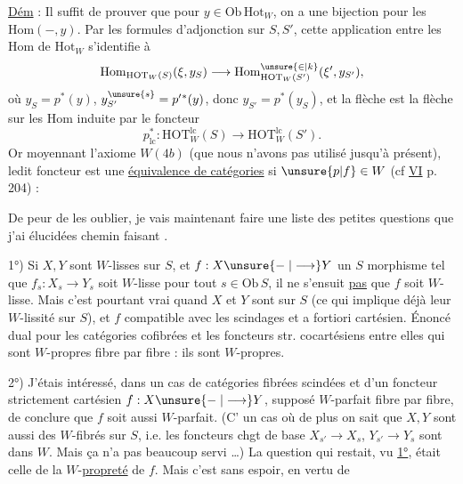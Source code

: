 \uline{Dém} : Il suffit de prouver que pour  $y\in\mathrm{Ob}\,\mathrm{Hot}_W$, on a une bijection pour les $\mathrm{Hom}(-,y)$. Par les formules d'adjonction sur $S,S'$, cette application entre les $\mathrm{Hom}$ de $\mathrm{Hot}_W$ s'identifie à
\[
\mathrm{Hom}_{\mathrm{HOT}_W(S)}(\xi,y_S)\longrightarrow\mathrm{Hom}_{\mathrm{HOT}_W(S')}^{\unsure{\in|k}}(\xi',y_{S'}),
\]
où $y_S=p^*(y)$, $y_{S'}^{\unsure{s}}=p'{}^*(y)$, donc $y_{S'}=p^*(y_S)$, et la flèche \unsure{(**)} est la flèche sur les $\mathrm{Hom}$ induite par le foncteur
\[
p_{\mathrm{lc}}^*:\mathrm{HOT}_W^{\mathrm{lc}}(S)\longrightarrow\mathrm{HOT}_W^{\mathrm{lc}}(S').
\]
Or moyennant l'axiome $W(4b)$\unsure{,} (que nous n'avons pas utilisé jusqu'à présent), ledit foncteur est une \uline{équivalence de catégories} si $\unsure{p|f}\in W$ (cf \uline{VI} p. 204) : 

De peur de les oublier, je vais maintenant faire une liste des petites questions que j'ai élucidées chemin faisant .

1°) Si $X,Y$ sont $W$-lisses sur $S$, et $f:X\unsure{\relbar|\longrightarrow}Y$ un $S$ morphisme tel que $f_s:X_s\longrightarrow Y_s$ soit $W$-lisse pour tout $s\in\mathrm{Ob}\,S$, il ne s'ensuit \uline{pas} que $f$ soit $W$-lisse. Mais c'est pourtant vrai quand $X$ et $Y$ sont   sur $S$ (ce
qui implique déjà leur $W$-lissité sur $S$), et $f$ compatible avec les scindages et a fortiori cartésien. Énoncé dual pour les catégories cofibrées  et les foncteurs str. cocartésiens entre elles qui sont $W$-propres fibre par fibre : ils sont $W$-propres.

2°) J'étais intéressé, dans un cas de catégories fibrées scindées  et d'un foncteur strictement cartésien $f:X\unsure{\relbar|\longrightarrow}Y$, supposé $W$-parfait fibre par fibre, de conclure que $f$ soit aussi $W$-parfait.  (C' un cas où de plus on sait  que
$X,Y$ sont aussi des $W$-fibrés sur $S$, i.e. les foncteurs chgt de base $X_{s'}\longrightarrow X_s$, $Y_{s'}\longrightarrow Y_s$ sont dans $W$. Mais ça n'a pas beaucoup servi \ldots) La question qui restait, vu \uline{1°}, était celle de la $W$-\uline{propreté} de $f$. Mais c'est sans espoir,  en vertu de  

